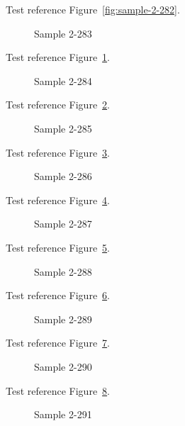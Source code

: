 Test reference Figure~\ref{fig:sample-2-282}.

\begin{figure}[tbhp]
\caption{Sample 2-283}
\label{fig:sample-2-283}
\end{figure}

Test reference Figure~\ref{fig:sample-2-283}.

\begin{figure}[tbhp]
\caption{Sample 2-284}
\label{fig:sample-2-284}
\end{figure}

Test reference Figure~\ref{fig:sample-2-284}.

\begin{figure}[tbhp]
\caption{Sample 2-285}
\label{fig:sample-2-285}
\end{figure}

Test reference Figure~\ref{fig:sample-2-285}.

\begin{figure}[tbhp]
\caption{Sample 2-286}
\label{fig:sample-2-286}
\end{figure}

Test reference Figure~\ref{fig:sample-2-286}.

\begin{figure}[tbhp]
\caption{Sample 2-287}
\label{fig:sample-2-287}
\end{figure}

Test reference Figure~\ref{fig:sample-2-287}.

\begin{figure}[tbhp]
\caption{Sample 2-288}
\label{fig:sample-2-288}
\end{figure}

Test reference Figure~\ref{fig:sample-2-288}.

\begin{figure}[tbhp]
\caption{Sample 2-289}
\label{fig:sample-2-289}
\end{figure}

Test reference Figure~\ref{fig:sample-2-289}.

\begin{figure}[tbhp]
\caption{Sample 2-290}
\label{fig:sample-2-290}
\end{figure}

Test reference Figure~\ref{fig:sample-2-290}.

\begin{figure}[tbhp]
\caption{Sample 2-291}
\label{fig:sample-2-291}
\end{figure}

